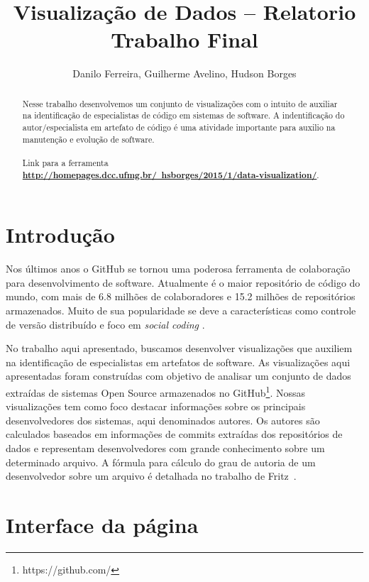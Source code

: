 \documentclass[12pt]{article}
\title{Visualização de Dados -- Relatorio Trabalho Final}
\author{Danilo Ferreira, Guilherme Avelino, Hudson Borges}
\begin{document}
\maketitle

\begin{abstract}
Nesse trabalho desenvolvemos um conjunto de visualizações com o intuito de auxiliar na identificação de especialistas de código em sistemas de software. A indentificação do autor/especialista em artefato de código é uma atividade importante   para auxilio na manutenção e evolução de software.\\ \\ Link para a ferramenta \textbf{\href{http://homepages.dcc.ufmg.br/~hsborges/2015/1/data-visualization/}{http://homepages.dcc.ufmg.br/~hsborges/2015/1/data-visualization/}}.
\end{abstract}


\section{Introdução}

Nos últimos anos o GitHub se tornou uma poderosa ferramenta de colaboração para desenvolvimento de software. Atualmente é o maior repositório de código do mundo, com mais de 6.8 milhões de colaboradores e 15.2 milhões de repositórios armazenados. Muito de sua popularidade se deve a características como controle de versão distribuído e foco em \textit{social coding} \cite{Dabbish2012}. 

No trabalho aqui apresentado, buscamos desenvolver visualizações que auxiliem na identificação de especialistas em artefatos de software. As visualizações aqui apresentadas foram construídas com objetivo de analisar um conjunto de dados extraídas de sistemas Open Source armazenados no GitHub\footnote{https://github.com/}. Nossas visualizações tem como foco destacar informações sobre os principais desenvolvedores dos sistemas, aqui denominados autores. Os autores são calculados baseados em informações de commits extraídas dos repositórios de dados e representam desenvolvedores com grande conhecimento sobre um determinado arquivo. A fórmula para cálculo do grau de autoria de um desenvolvedor sobre um arquivo é detalhada no trabalho de Fritz~\cite{Fritz2014}.



\section{Interface da página}
\end{document}

